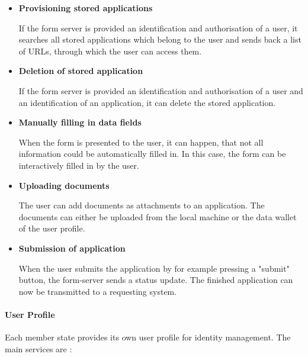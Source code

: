 \begin{itemize}
    \item \textbf{Provisioning stored applications}
    
    If the form server is provided an identification and authorisation of a user, it searches all stored applications which belong to the user and sends back a list of URLs, through which the user can access them.
    
    \item \textbf{Deletion of stored application}

    If the form server is provided an identification and authorisation of a user and an identification of an application, it can delete the stored application.

    \item \textbf{Manually filling in data fields}
    
    When the form is presented to the user, it can happen, that not all information could be automatically filled in. In this case, the form can be interactively filled in by the user.
    
    \item \textbf{Uploading documents}
    
    The user can add documents as attachments to an application. The documents can either be uploaded from the local machine or the data wallet of the user profile.

    \item \textbf{Submission of application}
    
    When the user submits the application by for example pressing a "submit" button, the form-server sends a status update. The finished application can now be transmitted to a requesting system.

\end{itemize}

\paragraph{User Profile}
Each member state provides its own user profile for identity management. The main services are \cite{NRW:Umsetzung}:

